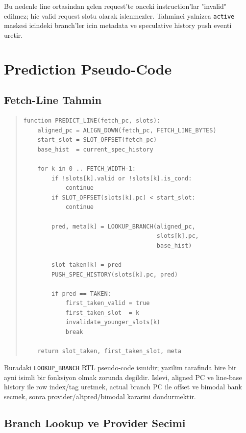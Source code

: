 \documentclass[11pt,a4paper]{article}
\newcommand{\code}[1]{\texttt{#1}}
\begin{document}
Bu nedenle line ortasindan gelen request'te onceki instruction'lar "invalid"
edilmez; hic valid request slotu olarak islenmezler. Tahminci yalnizca
\code{active} maskesi icindeki branch'ler icin metadata ve speculative history
push eventi uretir.

\section{Prediction Pseudo-Code}

\subsection{Fetch-Line Tahmin}

\begin{quote}
\footnotesize
\begin{verbatim}
function PREDICT_LINE(fetch_pc, slots):
    aligned_pc = ALIGN_DOWN(fetch_pc, FETCH_LINE_BYTES)
    start_slot = SLOT_OFFSET(fetch_pc)
    base_hist  = current_spec_history

    for k in 0 .. FETCH_WIDTH-1:
        if !slots[k].valid or !slots[k].is_cond:
            continue
        if SLOT_OFFSET(slots[k].pc) < start_slot:
            continue

        pred, meta[k] = LOOKUP_BRANCH(aligned_pc,
                                      slots[k].pc,
                                      base_hist)

        slot_taken[k] = pred
        PUSH_SPEC_HISTORY(slots[k].pc, pred)

        if pred == TAKEN:
            first_taken_valid = true
            first_taken_slot  = k
            invalidate_younger_slots(k)
            break

    return slot_taken, first_taken_slot, meta
\end{verbatim}
\end{quote}

Buradaki \code{LOOKUP\_BRANCH} RTL pseudo-code ismidir; yazilim tarafinda bire
bir ayni isimli bir fonksiyon olmak zorunda degildir. Islevi, aligned PC ve
line-base history ile row index/tag uretmek, actual branch PC ile offset ve
bimodal bank secmek, sonra provider/altpred/bimodal kararini dondurmektir.

\subsection{Branch Lookup ve Provider Secimi}
\end{document}
